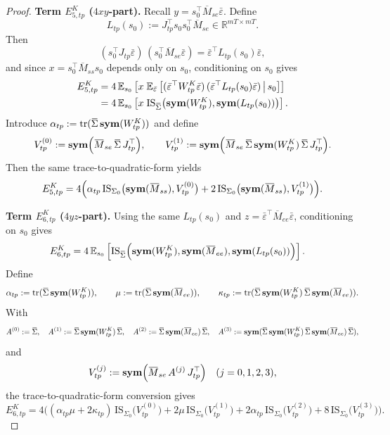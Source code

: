 \begin{proof}
\medskip
\noindent\textbf{Term $E^{K}_{5,tp}$ ($4xy$-part).}
Recall $y=s_0^\top\overline M_{se}\bar\varepsilon$. Define
\[
L_{tp}(s_0):=J_{tp}^\top s_0 s_0^\top \overline M_{se}\in\mathbb R^{mT\times mT}.
\]
Then
\[
(s_0^\top J_{tp}\bar\varepsilon)\,(s_0^\top \overline M_{se}\bar\varepsilon)
=\bar\varepsilon^\top L_{tp}(s_0)\bar\varepsilon,
\]
and since $x=s_0^\top\overline M_{ss}s_0$ depends only on $s_0$, conditioning on $s_0$ gives
\begin{align}
E^{K}_{5,tp}
&=4\,\mathbb E_{s_0} \left[
x\;\mathbb E_{\bar\varepsilon} \left[(\bar\varepsilon^\top W^K_{tp}\bar\varepsilon)\,(\bar\varepsilon^\top L_{tp}(s_0)\bar\varepsilon)\,\middle|\,s_0\right]\right]\nonumber\\
&=4\,\mathbb E_{s_0} \left[x\;\mathrm{IS}_{\overline\Sigma} \big(\symfun(W^K_{tp}),\symfun(L_{tp}(s_0))\big)\right].\label{eq:Etp_cond}
\end{align}
Introduce $\alpha_{tp}:=\tr(\overline\Sigma\,\symfun(W^K_{tp}))$ and define
\[
V^{(0)}_{tp}:=\symfun \Big(\overline M_{se}\,\overline\Sigma\,J_{tp}^\top\Big),\qquad
V^{(1)}_{tp}:=\symfun \Big(\overline M_{se}\,\overline\Sigma\,\symfun(W^K_{tp})\,\overline\Sigma\,J_{tp}^\top\Big).
\]
Then the same trace-to-quadratic-form yields
\begin{equation}\label{eq:Etp_final}
E^{K}_{5,tp}
=
4\Big(
\alpha_{tp}\,\mathrm{IS}_{\Sigma_0} \big(\symfun(\overline M_{ss}),V^{(0)}_{tp}\big)
+2\,\mathrm{IS}_{\Sigma_0} \big(\symfun(\overline M_{ss}),V^{(1)}_{tp}\big)
\Big).
\end{equation}

\medskip
\noindent\textbf{Term $E^{K}_{6,tp}$ ($4yz$-part).}
Using the same $L_{tp}(s_0)$ and $z=\bar\varepsilon^\top\overline M_{ee}\bar\varepsilon$, conditioning on $s_0$ gives
\begin{align}
E^{K}_{6,tp}
&=4\,\mathbb E_{s_0} \left[
\mathrm{IS}_{\overline\Sigma} \Big(\symfun(W^K_{tp}),\symfun(\overline M_{ee}),\symfun(L_{tp}(s_0))\Big)\right].
\label{eq:Ftp_cond}
\end{align}
Define
\[
\alpha_{tp}:=\tr(\overline\Sigma\,\symfun(W^K_{tp})),\qquad
\mu:=\tr(\overline\Sigma\,\symfun(\overline M_{ee})),\qquad
\kappa_{tp}:=\tr(\overline\Sigma\,\symfun(W^K_{tp})\,\overline\Sigma\,\symfun(\overline M_{ee})).
\]
With
\[
A^{(0)}:=\overline\Sigma,\quad
A^{(1)}:=\overline\Sigma\,\symfun(W^K_{tp})\,\overline\Sigma,\quad
A^{(2)}:=\overline\Sigma\,\symfun(\overline M_{ee})\,\overline\Sigma,\quad
A^{(3)}:=\symfun(\overline\Sigma\,\symfun(W^K_{tp})\,\overline\Sigma\,\symfun(\overline M_{ee})\,\overline\Sigma),
\]
and
\[
V^{(j)}_{tp}:=\symfun \Big(\overline M_{se}\,A^{(j)}\,J_{tp}^\top\Big)\quad (j=0,1,2,3),
\]
the trace-to-quadratic-form conversion gives
\begin{equation}\label{eq:Ftp_final}
E^{K}_{6,tp}
=
4\Big(
(\alpha_{tp}\mu+2\kappa_{tp})\,\mathrm{IS}_{\Sigma_0} \big(V^{(0)}_{tp}\big)
+2\mu\,\mathrm{IS}_{\Sigma_0} \big(V^{(1)}_{tp}\big)
+2\alpha_{tp}\,\mathrm{IS}_{\Sigma_0} \big(V^{(2)}_{tp}\big)
+8\,\mathrm{IS}_{\Sigma_0} \big(V^{(3)}_{tp}\big)
\Big).
\end{equation}


\end{proof}
